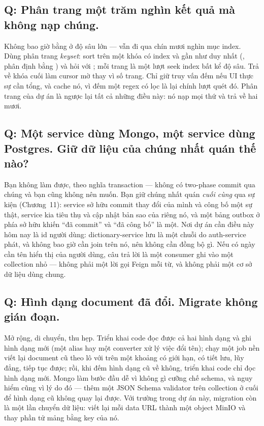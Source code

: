 \subsection*{Q: Phân trang một trăm nghìn kết quả mà không nạp chúng.}

Không bao giờ bằng  ở độ sâu lớn ---  vẫn
đi qua chín mươi nghìn mục index. Dùng phân trang \emph{keyset}: sort
trên một khóa có index và gần như duy nhất (, phân định bằng
) và hỏi  với
; mỗi trang là một lượt seek index bất kể độ sâu. Trả
về khóa cuối làm cursor mờ thay vì số trang. Chỉ giữ truy vấn đếm nếu
UI thực sự cần tổng, và cache nó, vì đếm một regex có lọc là lại chính
lượt quét đó. Phân trang  của dự án là ngược lại tất cả
những điều này: nó nạp mọi thứ và trả về hai mươi.

\subsection*{Q: Một service dùng Mongo, một service dùng Postgres. Giữ dữ liệu của chúng nhất quán thế nào?}

Bạn không làm được, theo nghĩa transaction --- không có two-phase
commit qua chúng và bạn cũng không nên muốn. Bạn giữ chúng nhất quán
\emph{cuối cùng} qua sự kiện (Chương~11): service sở hữu commit thay
đổi của mình và công bố một sự thật, service kia tiêu thụ và cập nhật
bản sao của riêng nó, và một bảng outbox ở phía sở hữu khiến ``đã
commit'' và ``đã công bố'' là một. Nơi dự án cần điều này hôm nay là id
người dùng: dictionary-service lưu  là một chuỗi
do auth-service phát, và không bao giờ cần join trên nó, nên không cần
đồng bộ gì. Nếu có ngày cần tên hiển thị của người dùng, câu trả lời là
một consumer  ghi vào một collection 
nhỏ --- không phải một lời gọi Feign mỗi từ, và không phải một cơ sở dữ
liệu dùng chung.

\subsection*{Q: Hình dạng document đã đổi. Migrate không gián đoạn.}

Mở rộng, di chuyển, thu hẹp. Triển khai code đọc được cả hai hình dạng
và ghi hình dạng mới (một alias  hay một converter xử lý
việc đổi tên); chạy một job nền viết lại document cũ theo lô với
 trên một khoảng  có giới hạn, có tiết lưu,
lũy đẳng, tiếp tục được; rồi, khi đếm hình dạng cũ về không, triển khai
code chỉ đọc hình dạng mới. Mongo làm bước đầu dễ vì không gì cưỡng chế
schema, và nguy hiểm cũng vì lý do đó --- thêm một JSON Schema
validator trên collection ở cuối để hình dạng cũ không quay lại được.
Với trường  trong dự án này, migration còn là một lần
chuyển dữ liệu: viết lại mỗi data URL thành một object MinIO và thay
phần tử mảng bằng key của nó.

